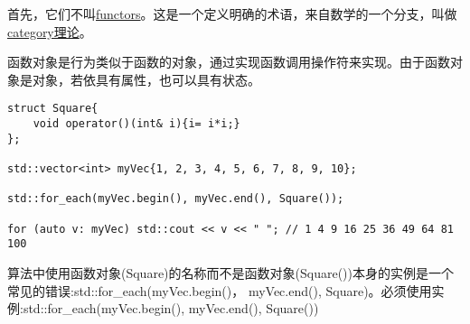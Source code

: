 首先，它们不叫\href{https://en.wikipedia.org/wiki/Functor}{functors}。这是一个定义明确的术语，来自数学的一个分支，叫做\href{https://en.wikipedia.org/wiki/Category_theory}{category理论}。

函数对象是行为类似于函数的对象，通过实现函数调用操作符来实现。由于函数对象是对象，若依具有属性，也可以具有状态。

\begin{lstlisting}[style=styleCXX]
struct Square{
	void operator()(int& i){i= i*i;}
};

std::vector<int> myVec{1, 2, 3, 4, 5, 6, 7, 8, 9, 10};

std::for_each(myVec.begin(), myVec.end(), Square());

for (auto v: myVec) std::cout << v << " "; // 1 4 9 16 25 36 49 64 81 100
\end{lstlisting}

\begin{tcolorbox}[colback=blue!5!white,colframe=blue!75!black,title={实例化函数对象}]
算法中使用函数对象(Square)的名称而不是函数对象(Square())本身的实例是一个常见的错误:std::for\_each(myVec.begin()， myVec.end(), Square)。必须使用实例:std::for\_each(myVec.begin(), myVec.end(), Square())
\end{tcolorbox}